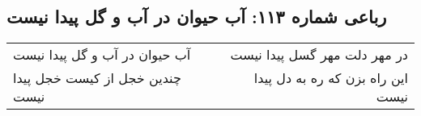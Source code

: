 \begin{center}
\section*{رباعی شماره ۱۱۳: آب حیوان در آب و گل پیدا نیست}
\label{sec:0113}
\begin{longtable}{l p{0.5cm} r}
آب حیوان در آب و گل پیدا نیست
&&
در مهر دلت مهر گسل پیدا نیست
\\
چندین خجل از کیست خجل پیدا نیست
&&
این راه بزن که ره به دل پیدا نیست
\\
\end{longtable}
\end{center}
